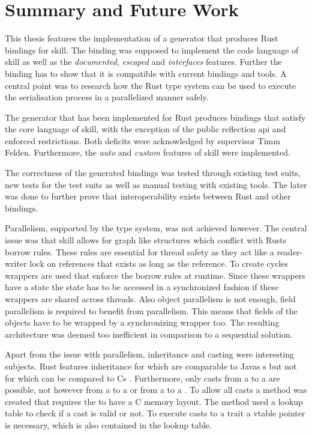 \documentclass[thesis]{subfiles}
\begin{document}
\chapter{Summary and Future Work}%
\vspace*{-.12em}%
This thesis features the implementation of a generator that produces Rust bindings for \gls{skill}.
The binding was supposed to implement the code language of \gls{skill} as well as the \emph{documented}, \emph{escaped} and \emph{interfaces} features.
Further the binding has to show that it is compatible with current bindings and tools.
A central point was to research how the Rust type system can be used to execute the serialisation process in a parallelized manner safely.

The generator that has been implemented for Rust produces bindings that satisfy the core language of \gls{skill}, with the exception of the public reflection \gls{api} and  enforced restrictions.
Both deficits were acknowledged by supervisor Timm Felden.
Furthermore, the \emph{auto} and \emph{custom} features of \gls{skill} were implemented.

The correctness of the generated bindings was tested through existing test suits, new tests for the test suits as well as manual testing with existing tools.
The later was done to further prove that interoperability exists between Rust and other bindings.

Parallelism, supported by the type system, was not achieved however.
The central issue was that \gls{skill} allows for graph like structures which conflict with Rusts borrow rules.
These rules are essential for thread safety as they act like a reader-writer lock on references that exists as long as the reference.
To create cycles wrappers are used that enforce the borrow rules at runtime.
Since these wrappers have a state the state has to be accessed in a synchronized fashion if these wrappers are shared across threads.
Also object parallelism is not enough, field parallelism is required to benefit from parallelism.
This means that fields of the objects have to be wrapped by a synchronizing wrapper too.
The resulting architecture was deemed too inefficient in comparison to a sequential solution.

Apart from the issue with parallelism, inheritance and casting were interesting subjects.
Rust features inheritance for \traits which are comparable to Javas s but not for \structs which can be compared to Cs \structs.
Furthermore, only casts from a \struct to a \trait are possible, not however from a \trait to a \struct or from a \trait to a \trait.
To allow all casts a method was created that requires the \structs to have a C memory layout.
The method used a lookup table to check if a cast is valid or not.
To execute casts to a trait a vtable pointer is necessary, which is also contained in the lookup table.
\end{document}
